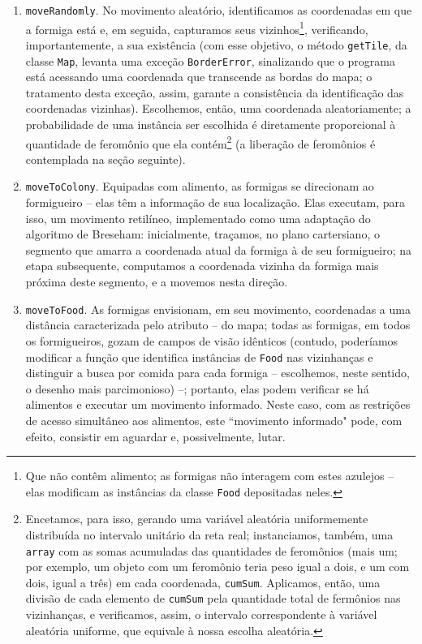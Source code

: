 \documentclass[12pt]{article}
\theoremstyle{definition}
\begin{document}
\begin{enumerate} 
	\item \texttt{moveRandomly}. No movimento aleatório, identificamos as coordenadas em que a formiga está e, em seguida, capturamos seus vizinhos\footnote{Que não contêm alimento; as formigas não interagem com estes azulejos -- elas modificam as instâncias da classe \texttt{Food} depositadas neles.}, verificando, importantemente, a sua existência (com esse objetivo, o método \texttt{getTile}, da classe \texttt{Map}, levanta uma exceção \texttt{BorderError}, sinalizando que o programa está acessando uma coordenada que transcende as bordas do mapa; o tratamento desta exceção, assim, garante a consistência da identificação das coordenadas vizinhas). Escolhemos, então, uma coordenada aleatoriamente; a probabilidade de uma instância ser escolhida é diretamente proporcional à quantidade de feromônio que ela contém\footnote{Encetamos, para isso, gerando uma variável aleatória uniformemente distribuída no intervalo unitário da reta real; instanciamos, também, uma \texttt{array} com as somas acumuladas das quantidades de feromônios (mais um; por exemplo, um objeto com um feromônio teria peso igual a dois, e um com dois, igual a três) em cada coordenada, \texttt{cumSum}. Aplicamos, então, uma divisão de cada elemento de \texttt{cumSum} pela quantidade total de fermônios nas vizinhanças, e verificamos, assim, o intervalo correspondente à variável aleatória uniforme, que equivale à nossa escolha aleatória.} (a liberação de feromônios é contemplada na seção seguinte). 
	\item \texttt{moveToColony}. Equipadas com alimento, as formigas se direcionam ao formigueiro -- elas têm a informação de sua localização. Elas executam, para isso, um movimento retilíneo, implementado como uma adaptação do algoritmo de Breseham: inicialmente, traçamos, no plano cartersiano, o segmento que amarra a coordenada atual da formiga à de seu formigueiro; na etapa subsequente, computamos a coordenada vizinha da formiga mais próxima deste segmento, e a movemos nesta direção.  
	\item \texttt{moveToFood}. As formigas envisionam, em seu movimento, coordenadas a uma distância caracterizada pelo atributo -- do mapa; todas as formigas, em todos os formigueiros, gozam de campos de visão idênticos (contudo, poderíamos modificar a função que identifica instâncias de \texttt{Food} nas vizinhanças e distinguir a busca por comida para cada formiga -- escolhemos, neste sentido, o desenho mais parcimonioso) --; portanto, elas podem verificar se há alimentos e executar um movimento informado. Neste caso, com as restrições de acesso simultâneo aos alimentos, este ``movimento informado" pode, com efeito, consistir em aguardar e, possivelmente, lutar.  
\end{enumerate} 
\end{document}
